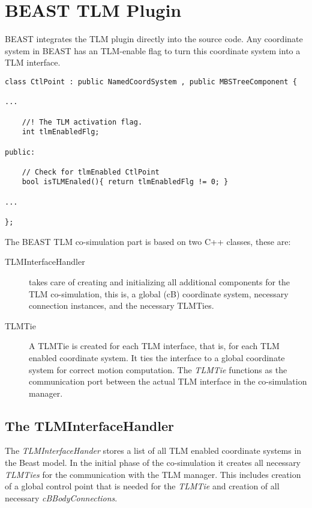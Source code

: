 \chapter{BEAST TLM Plugin}

BEAST integrates the TLM plugin directly into the source code. Any
coordinate system in BEAST has an TLM-enable flag to turn this
coordinate system into a TLM interface.

{\scriptsize
\begin{verbatim}
class CtlPoint : public NamedCoordSystem , public MBSTreeComponent {

...

    //! The TLM activation flag.
    int tlmEnabledFlg;

public:

    // Check for tlmEnabled CtlPoint
    bool isTLMEnaled(){ return tlmEnabledFlg != 0; }

...

};
\end{verbatim}
}

The BEAST TLM co-simulation part is based on two C++ classes, these
are:
\begin{description}
\item[TLMInterfaceHandler] takes care of creating and initializing all
  additional components for the TLM co-simulation, this is, a global
  (cB) coordinate system, necessary connection instances, and the
  necessary TLMTies.
\item[TLMTie] A TLMTie is created for each TLM interface, that is, for
  each TLM enabled coordinate system. It ties the interface to a
  global coordinate system for correct motion computation. The {\em
    TLMTie} functions as the communication port between the actual TLM
  interface in the co-simulation manager.
\end{description}


\section{The TLMInterfaceHandler}

The {\em TLMInterfaceHander} stores a list of all TLM enabled coordinate
systems in the Beast model. In the initial phase of the co-simulation
it creates all necessary {\em TLMTies} for the communication with the
TLM manager. This includes creation of a global control point that is
needed for the {\em TLMTie} and creation of all necessary {\em
  cBBodyConnections}.


